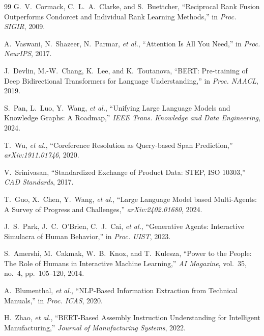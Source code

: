 \documentclass[12pt, a4paper]{article}
\begin{document}
\begin{thebibliography}{99}
G.~V.~Cormack, C.~L.~A.~Clarke, and S.~Buettcher,
``Reciprocal Rank Fusion Outperforms Condorcet and Individual Rank Learning Methods,''
in \textit{Proc. SIGIR}, 2009.

A.~Vaswani, N.~Shazeer, N.~Parmar, \textit{et al.},
``Attention Is All You Need,''
in \textit{Proc. NeurIPS}, 2017.

J.~Devlin, M.-W.~Chang, K.~Lee, and K.~Toutanova,
``BERT: Pre-training of Deep Bidirectional Transformers for Language Understanding,''
in \textit{Proc. NAACL}, 2019.

S.~Pan, L.~Luo, Y.~Wang, \textit{et al.},
``Unifying Large Language Models and Knowledge Graphs: A Roadmap,''
\textit{IEEE Trans. Knowledge and Data Engineering}, 2024.

T.~Wu, \textit{et al.},
``Coreference Resolution as Query-based Span Prediction,''
\textit{arXiv:1911.01746}, 2020.

V.~Srinivasan,
``Standardized Exchange of Product Data: STEP, ISO 10303,''
\textit{CAD Standards}, 2017.

T.~Guo, X.~Chen, Y.~Wang, \textit{et al.},
``Large Language Model based Multi-Agents: A Survey of Progress and Challenges,''
\textit{arXiv:2402.01680}, 2024.

J.~S.~Park, J.~C.~O'Brien, C.~J.~Cai, \textit{et al.},
``Generative Agents: Interactive Simulacra of Human Behavior,''
in \textit{Proc. UIST}, 2023.

S.~Amershi, M.~Cakmak, W.~B.~Knox, and T.~Kulesza,
``Power to the People: The Role of Humans in Interactive Machine Learning,''
\textit{AI Magazine}, vol.~35, no.~4, pp.~105--120, 2014.

A.~Blumenthal, \textit{et al.},
``NLP-Based Information Extraction from Technical Manuals,''
in \textit{Proc. ICAS}, 2020.

H.~Zhao, \textit{et al.},
``BERT-Based Assembly Instruction Understanding for Intelligent Manufacturing,''
\textit{Journal of Manufacturing Systems}, 2022.

\end{thebibliography}
\end{document}
